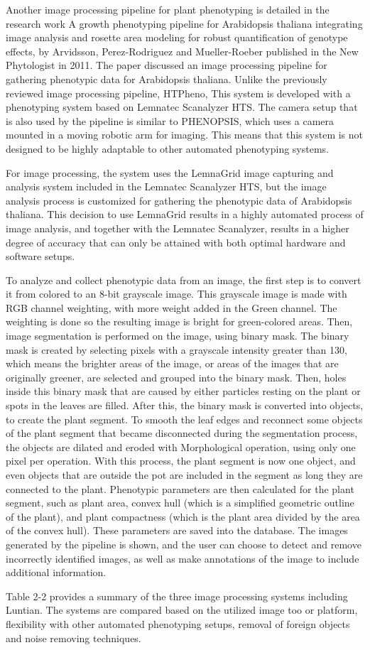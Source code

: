 Another image processing pipeline for plant phenotyping is detailed in the  research work A growth phenotyping pipeline for Arabidopsis thaliana integrating image analysis and rosette area modeling for robust quantification of genotype effects, by Arvidsson, Perez-Rodriguez and Mueller-Roeber published in the New Phytologist in 2011. The paper discussed an image processing pipeline for gathering phenotypic data for Arabidopsis thaliana. Unlike the previously reviewed image processing pipeline, HTPheno, This system is developed with a phenotyping system based on Lemnatec Scanalyzer HTS. The camera setup that is also used by the pipeline is similar to PHENOPSIS, which uses a camera mounted in a moving robotic arm for imaging. This means that this system is not designed to be highly adaptable to other automated phenotyping systems.
 
For image processing, the system uses the LemnaGrid image capturing and analysis system included in the Lemnatec Scanalyzer HTS, but the image analysis process is customized for gathering the phenotypic data of Arabidopsis thaliana. This decision to use LemnaGrid results in a highly automated process of image analysis, and together with the Lemnatec Scanalyzer, results in a higher degree of accuracy that can only be attained with both optimal hardware and software setups.
 
To analyze and collect phenotypic data from an image, the first step is to convert it from colored to an 8-bit grayscale image. This grayscale image is made with RGB channel weighting, with more weight added in the Green channel. The weighting is done so the resulting image is bright for green-colored areas. Then, image segmentation is performed on the image, using binary mask. The binary mask is created by selecting pixels with a grayscale intensity greater than 130, which means the brighter areas of the image, or areas of the images that are originally greener, are selected and grouped into the binary mask. Then, holes inside this binary mask that are caused by either particles resting on the plant or spots in the leaves are filled. After this, the binary mask is converted into objects, to create the plant segment. To smooth the leaf edges and reconnect some objects of the plant segment that became disconnected during the segmentation process, the objects are dilated and eroded with Morphological operation, using only one pixel per operation. With this process, the plant segment is now one object, and even objects that are outside the pot are included in the segment as long they are connected to the plant. Phenotypic parameters are then calculated for the plant segment, such as plant area, convex hull (which is a simplified geometric outline of the plant), and plant compactness (which is the plant area divided by the area of the convex hull). These parameters are saved into the database. The images generated by the pipeline is shown, and the user can choose to detect and remove incorrectly identified images, as well as make annotations of the image to include additional information.

Table 2-2 provides a summary of the three image processing systems including Luntian.  The systems are compared based on the utilized image too or platform, flexibility with other automated phenotyping setups, removal of foreign objects and noise removing techniques.